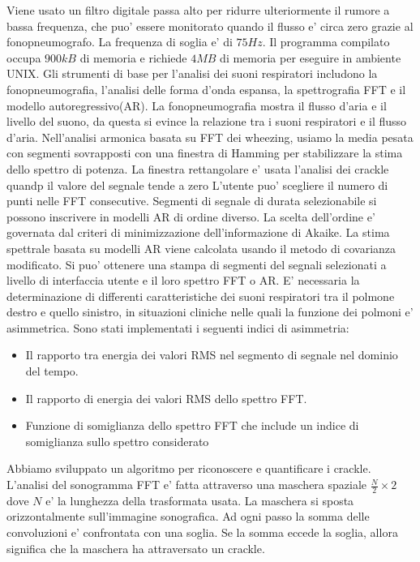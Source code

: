 Viene usato un filtro digitale passa alto per ridurre ulteriormente il rumore a bassa frequenza, che puo' essere monitorato quando il flusso e' circa zero grazie al fonopneumografo. La frequenza di soglia e' di $75Hz$. Il programma compilato occupa $900kB$ di memoria e richiede $4MB$ di memoria per eseguire in ambiente UNIX. Gli strumenti di base per l'analisi dei suoni respiratori includono la fonopneumografia, l'analisi delle forma d'onda espansa, la spettrografia FFT e il modello autoregressivo(AR). La fonopneumografia mostra il flusso d'aria e il livello del suono, da questa si evince la relazione tra i suoni respiratori e il flusso d'aria. Nell'analisi armonica basata su FFT dei wheezing, usiamo la media pesata con segmenti sovrapposti con una finestra di Hamming per stabilizzare la stima dello spettro di potenza. La finestra rettangolare e' usata l'analisi dei crackle quandp il valore del segnale tende a zero L'utente puo' scegliere il numero di punti nelle FFT consecutive. Segmenti di segnale di 
durata selezionabile si possono inscrivere in modelli AR di ordine diverso. La scelta dell'ordine e' governata dal criteri di minimizzazione dell'informazione di Akaike. La stima spettrale basata su modelli AR viene calcolata usando il metodo di covarianza modificato. Si puo' ottenere una stampa di segmenti del segnali selezionati a livello di interfaccia utente e il loro spettro FFT o AR. E' necessaria la determinazione di differenti caratteristiche dei suoni respiratori tra il polmone destro e quello sinistro, in situazioni cliniche nelle quali la funzione dei polmoni e' asimmetrica. Sono stati implementati i seguenti indici di asimmetria:
\begin{itemize}
  \item 
    Il rapporto tra energia dei valori RMS nel segmento di segnale nel dominio del tempo.
  \item
    Il rapporto di energia dei valori RMS dello spettro FFT.
  \item
    Funzione di somiglianza dello spettro FFT che include un indice di somiglianza sullo spettro considerato
\end{itemize}


Abbiamo sviluppato un algoritmo per riconoscere e quantificare i crackle. L'analisi del sonogramma FFT e' fatta attraverso una maschera spaziale $\frac{N}{2} \times 2$ dove $N$ e' la lunghezza della trasformata usata. La maschera si sposta orizzontalmente sull'immagine sonografica. Ad ogni passo la somma delle convoluzioni e' confrontata con una soglia. Se la somma eccede la soglia, allora significa che la maschera ha attraversato un crackle.

